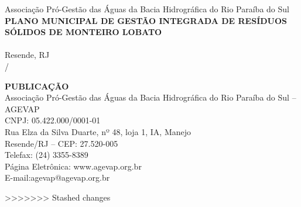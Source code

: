 \begin{center}
	\vspace{2em}
	Associação Pró-Gestão das Águas da Bacia Hidrográfica do Rio Paraíba do Sul\\
	\vspace{10cm}
	\textbf{{\Large PLANO MUNICIPAL DE GESTÃO INTEGRADA DE RESÍDUOS SÓLIDOS DE MONTEIRO LOBATO}\\}
	\vspace{2em}
	\textbf{{\Large \nomeProduto}}\\
	\vfill
	{\Large Resende, RJ\\
	\mes / \ano}
\end{center}

\pagebreak

\vspace*{\fill}%
\raggedright
{\textbf{PUBLICAÇÃO\\}
\vspace{2em}
Associação Pró-Gestão das Águas da Bacia Hidrográfica do Rio Paraíba do Sul – AGEVAP\\
CNPJ: 05.422.000/0001-01\\
Rua Elza da Silva Duarte, nº 48, loja 1, IA, Manejo\\
Resende/RJ – CEP: 27.520-005\\
Telefax: (24) 3355-8389\\
Página Eletrônica: www.agevap.org.br\\
E-mail:agevap@agevap.org.br}

>>>>>>> Stashed changes
\pagebreak

\clearpage
